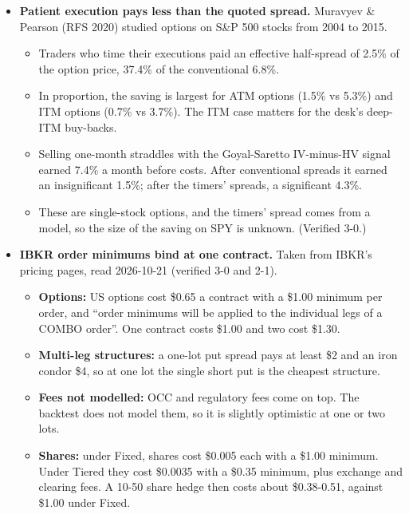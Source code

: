 \documentclass{article}
\begin{document}
\begin{itemize}

\item \textbf{Patient execution pays less than the quoted spread.} Muravyev \& Pearson (RFS 2020) studied options on S\&P 500 stocks from 2004 to 2015.

\begin{itemize}

\item Traders who time their executions paid an effective half-spread of 2.5\% of the option price, 37.4\% of the conventional 6.8\%.

\item In proportion, the saving is largest for ATM options (1.5\% vs 5.3\%) and ITM options (0.7\% vs 3.7\%). The ITM case matters for the desk's deep-ITM buy-backs.

\item Selling one-month straddles with the Goyal-Saretto IV-minus-HV signal earned 7.4\% a month before costs. After conventional spreads it earned an insignificant 1.5\%; after the timers' spreads, a significant 4.3\%.

\item These are single-stock options, and the timers' spread comes from a model, so the size of the saving on SPY is unknown. (Verified 3-0.)

\end{itemize}

\item \textbf{IBKR order minimums bind at one contract.} Taken from IBKR's pricing pages, read 2026-10-21 (verified 3-0 and 2-1).

\begin{itemize}

\item \textbf{Options:} US options cost \$0.65 a contract with a \$1.00 minimum per order, and ``order minimums will be applied to the individual legs of a COMBO order''. One contract costs \$1.00 and two cost \$1.30.

\item \textbf{Multi-leg structures:} a one-lot put spread pays at least \$2 and an iron condor \$4, so at one lot the single short put is the cheapest structure.

\item \textbf{Fees not modelled:} OCC and regulatory fees come on top. The backtest does not model them, so it is slightly optimistic at one or two lots.

\item \textbf{Shares:} under Fixed, shares cost \$0.005 each with a \$1.00 minimum. Under Tiered they cost \$0.0035 with a \$0.35 minimum, plus exchange and clearing fees. A 10-50 share hedge then costs about \$0.38-0.51, against \$1.00 under Fixed.


\end{itemize}
\end{itemize}
\end{document}
